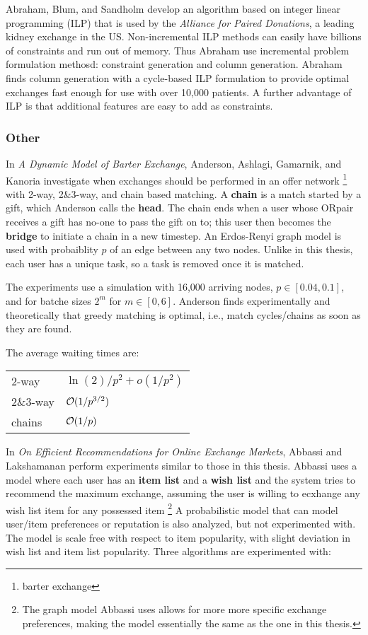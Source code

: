 \documentclass[main.tex]{subfiles}
\begin{document}
Abraham, Blum, and Sandholm \cite{Abr1} develop an algorithm based on integer linear programming (ILP) that is used by the \textit{Alliance for Paired Donations}, a leading kidney exchange in the US. Non-incremental ILP methods can easily have billions of constraints and run out of memory. Thus Abraham use incremental problem formulation methosd: constraint generation and column generation. Abraham finds column generation with a cycle-based ILP formulation to provide optimal exchanges fast enough for use with over 10,000 patients. A further advantage of ILP is that additional features are easy to add as constraints.

\subsubsection{Other}

In \textit{A Dynamic Model of Barter Exchange}, Anderson, Ashlagi, Gamarnik, and Kanoria \cite{And1} investigate when exchanges should be performed in an offer network \footnote{barter exchange} with 2-way, 2\&3-way, and chain based matching. A \textbf{chain} is a match started by a gift, which Anderson calls the \textbf{head}. The chain ends when a user whose ORpair receives a gift has no-one to pass the gift on to; this user then becomes the \textbf{bridge} to initiate a chain in a new timestep. An Erdos-Renyi graph model is used with probaiblity $p$ of an edge between any two nodes. Unlike in this thesis, each user has a unique task, so a task is removed once it is matched.

The experiments use a simulation with 16,000 arriving nodes, $p \in [0.04, 0.1]$, and for batche sizes $2^m$ for $m \in [0,6]$. Anderson finds experimentally and theoretically  that greedy matching is optimal, i.e., match cycles/chains as soon as they are found.

The average waiting times are:
\begin{center}
  \begin{tabular}{| l | l |}
    \hline
    2-way    & $\ln(2)/p^2 + o(1/p^2)$ \\
    2\&3-way & $\mathcal{O}(1/p^{3/2})$ \\
    chains   & $\mathcal{O}(1/p)$ \\
    \hline
  \end{tabular}
\end{center}

In \textit{On Efficient Recommendations for Online Exchange Markets}, Abbassi and Lakshamanan  perform experiments similar to those in this thesis. Abbassi uses a model where each user has an \textbf{item list} and a \textbf{wish list} and the system tries to recommend the maximum exchange, assuming the user is willing to ecxhange any wish list item for any possessed item \footnote{The graph model Abbassi uses allows for more more specific exchange preferences, making the model essentially the same as the one in this thesis.} A probabilistic model that can model user/item preferences or reputation is also analyzed, but not experimented with. The model is scale free with respect to item popularity, with slight deviation in wish list and item list popularity. Three algorithms are experimented with:
\end{document}
